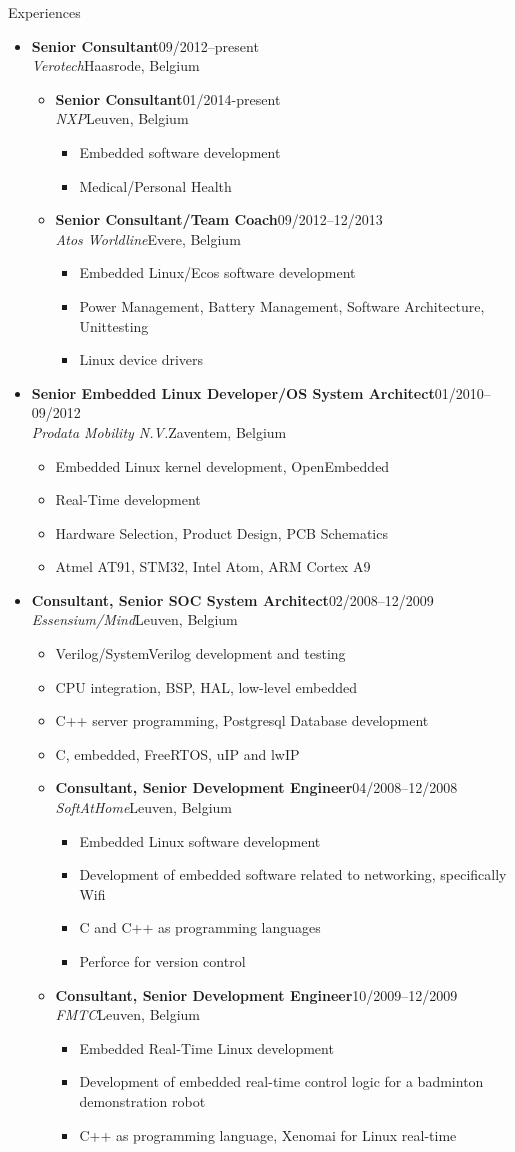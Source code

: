 \documentclass[12pt,oneside]{article}
\newenvironment{ressection}[1]{
	\vspace{5pt}
	{\selectfont\Large#1}
	\begin{itemize}
	\vspace{5pt}
}{
	\end{itemize}
}
\newcommand{\ressubitem}[1]{
	\vspace{-4pt}
	\item \begin{flushleft} #1 \end{flushleft}
}
\newcommand{\resbigitem}[4]{
	\vspace{-5pt}
	\item
	\textbf{#1}\hfill#4 \\
	\textit{#2}\hfill#3
}
\newenvironment{ressubsec}[4]{
	\resbigitem{#1}{#2}{#3}{#4}
	\vspace{-2pt}
	\begin{itemize}
}{
	\end{itemize}
}
\newenvironment{ressubsubsec}[4]{
	\vspace{5pt}
	\resbigitem{#1}{#2}{#3}{#4}
	\begin{itemize}
}{
	\end{itemize}
}
\newcommand{\ressubsubitem}[1]{
	\vspace{-1pt}
	\item \begin{flushleft} #1 \end{flushleft}
}
\begin{document}
\begin{ressection}{Experiences}
	\begin{ressubsec}{Senior Consultant}{Verotech}{Haasrode, Belgium}{09/2012--present}
		\begin{ressubsubsec}{Senior Consultant}{NXP}{Leuven, Belgium}{01/2014-present}
			\ressubsubitem{Embedded software development}
			\ressubsubitem{Medical/Personal Health}
		\end{ressubsubsec}
		\begin{ressubsubsec}{Senior Consultant/Team Coach}{Atos Worldline}{Evere, Belgium}{09/2012--12/2013}
			\ressubsubitem{Embedded Linux/Ecos software development}
			\ressubsubitem{Power Management, Battery Management, Software Architecture, Unittesting}
			\ressubsubitem{Linux device drivers}
		\end{ressubsubsec}
	\end{ressubsec}
	\begin{ressubsec}{Senior Embedded Linux Developer/OS System Architect}{Prodata Mobility N.V.}{Zaventem, Belgium}{01/2010--09/2012}
		\ressubsubitem{Embedded Linux kernel development, OpenEmbedded}
		\ressubsubitem{Real-Time development}
		\ressubsubitem{Hardware Selection, Product Design, PCB Schematics}
		\ressubsubitem{Atmel AT91, STM32, Intel Atom, ARM Cortex A9}
	\end{ressubsec}
	\begin{ressubsec}{Consultant, Senior SOC System Architect}{Essensium/Mind}{Leuven, Belgium}{02/2008--12/2009}
		\ressubitem{Verilog/SystemVerilog development and testing}
		\ressubitem{CPU integration, BSP, HAL, low-level embedded}
		\ressubitem{C++ server programming, Postgresql Database development}
		\ressubitem{C, embedded, FreeRTOS, uIP and lwIP}
		\begin{ressubsubsec}{Consultant, Senior Development Engineer}{SoftAtHome}{Leuven, Belgium}{04/2008--12/2008}
			\ressubsubitem{Embedded Linux software development}
			\ressubsubitem{Development of embedded software related to networking, specifically Wifi}
			\ressubsubitem{C and C++ as programming languages}
			\ressubsubitem{Perforce for version control}
		\end{ressubsubsec}
		\begin{ressubsubsec}{Consultant, Senior Development Engineer}{FMTC}{Leuven, Belgium}{10/2009--12/2009}
			\ressubsubitem{Embedded Real-Time Linux development}
			\ressubsubitem{Development of embedded real-time control logic for a badminton demonstration robot}
			\ressubsubitem{C++ as programming language, Xenomai for Linux real-time}

\end{ressubsubsec}
\end{ressubsec}
\end{ressection}
\end{document}
